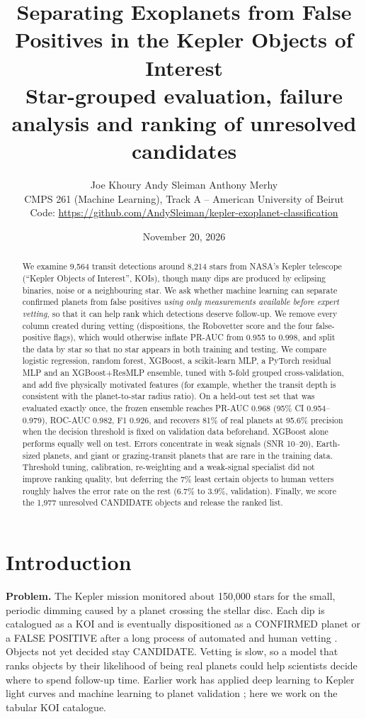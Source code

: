 \documentclass[11pt,a4paper]{article}
\title{\vspace{-1cm}\textbf{Separating Exoplanets from False Positives in the Kepler Objects of Interest}\\[2pt]
\large Star-grouped evaluation, failure analysis and ranking of unresolved candidates}
\author{Joe Khoury \quad Andy Sleiman \quad Anthony Merhy\\[2pt]
CMPS 261 (Machine Learning), Track A -- American University of Beirut\\[2pt]
Code: \url{https://github.com/AndySleiman/kepler-exoplanet-classification}}
\date{November 20, 2026}
\begin{document}
\maketitle

\begin{abstract}
We examine 9,564 transit detections around 8,214 stars from NASA's Kepler telescope (``Kepler Objects of Interest'', KOIs), though many dips are produced by eclipsing binaries, noise or a neighbouring star. We ask whether machine learning can separate confirmed planets from false positives \emph{using only measurements available before expert vetting}, so that it can help rank which detections deserve follow-up. We remove every column created during vetting (dispositions, the Robovetter score and the four false-positive flags), which would otherwise inflate PR-AUC from 0.955 to 0.998, and split the data by star so that no star appears in both training and testing. We compare logistic regression, random forest, XGBoost, a scikit-learn MLP, a PyTorch residual MLP and an XGBoost+ResMLP ensemble, tuned with 5-fold grouped cross-validation, and add five physically motivated features (for example, whether the transit depth is consistent with the planet-to-star radius ratio). On a held-out test set that was evaluated exactly once, the frozen ensemble reaches PR-AUC 0.968 (95\% CI 0.954--0.979), ROC-AUC 0.982, F1 0.926, and recovers 81\% of real planets at 95.6\% precision when the decision threshold is fixed on validation data beforehand. XGBoost alone performs equally well on test. Errors concentrate in weak signals (SNR 10--20), Earth-sized planets, and giant or grazing-transit planets that are rare in the training data. Threshold tuning, calibration, re-weighting and a weak-signal specialist did not improve ranking quality, but deferring the 7\% least certain objects to human vetters roughly halves the error rate on the rest (6.7\% to 3.9\%, validation). Finally, we score the 1,977 unresolved CANDIDATE objects and release the ranked list.
\end{abstract}

\section{Introduction}
\textbf{Problem.} The Kepler mission \citep{borucki2010} monitored about 150,000 stars for the small, periodic dimming caused by a planet crossing the stellar disc. Each dip is catalogued as a KOI and is eventually dispositioned as a CONFIRMED planet or a FALSE POSITIVE after a long process of automated and human vetting \citep{coughlin2016,thompson2018}. Objects not yet decided stay CANDIDATE. Vetting is slow, so a model that ranks objects by their likelihood of being real planets could help scientists decide where to spend follow-up time. Earlier work has applied deep learning to Kepler light curves \citep{shallue2018} and machine learning to planet validation \citep{armstrong2021}; here we work on the tabular KOI catalogue.
\end{document}
